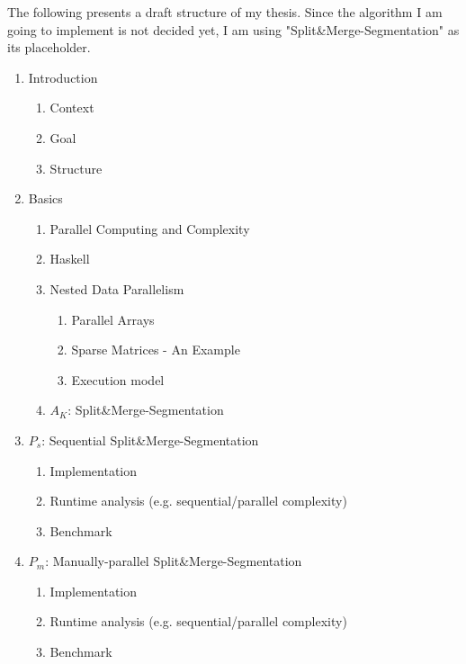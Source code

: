\documentclass{article}
\newcommand{\seq}[0]{$P_{s}$}
\renewcommand{\mp}[0]{$P_{m}$}
\newcommand{\algo}[0]{Split\&Merge-Segmentation}
\begin{document}
        The following presents a draft structure of my thesis.
        Since the algorithm I am going to implement is not decided yet, I am using "\algo" as its placeholder.
    
        \begin{enumerate}
        
        \item Introduction
            \begin{enumerate}
            \item Context
            \item Goal
            \item Structure
            \end{enumerate}
            
        \item Basics
            \begin{enumerate}
            \item Parallel Computing and Complexity
            \item Haskell
            \item Nested Data Parallelism
                \begin{enumerate}
                \item Parallel Arrays
                \item Sparse Matrices - An Example
                \item Execution model
                \end{enumerate}
            \item $A_{K}$: \algo
            \end{enumerate}
        
        \item \seq: Sequential \algo
            \begin{enumerate}
            \item Implementation
            \item Runtime analysis {\tiny (e.g. sequential/parallel complexity)}
            \item Benchmark
            \end{enumerate}
        
        \item \mp: Manually-parallel \algo
            \begin{enumerate}
            \item Implementation
            \item Runtime analysis {\tiny (e.g. sequential/parallel complexity)}
            \item Benchmark
            \end{enumerate}
            

\end{enumerate}
\end{document}
